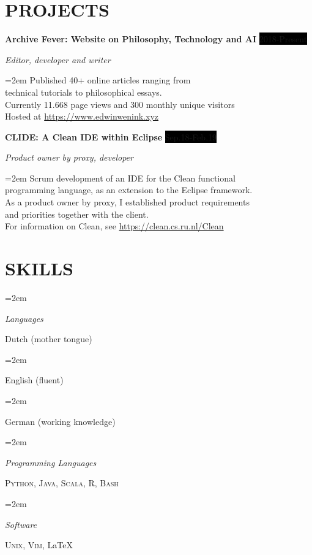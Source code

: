 \documentclass{article}
\newlength{\spacebox}
\newcommand{\sepspace}{\vspace*{1em}}		%
\newcommand{\NewPart}[1]{\section*{\uppercase{#1}}}
\newcommand{\PersonalEntry}[2]{
		\noindent\hangindent=2em\hangafter=0 %
		\parbox{\spacebox}{        %
		\textit{#1}}		       %
		\hspace{1.5em} #2 \par}    %
\newcommand{\SkillsEntry}[2]{      %
		\noindent\hangindent=2em\hangafter=0 %
		\parbox{\spacebox}{        %
		\textit{#1}}			   %
		\hspace{1.5em} #2 \par}    %
\newcommand{\EducationEntry}[4]{
		\noindent \textbf{#1} \hfill      %
		\colorbox{Black}{%
			\parbox{6em}{%
			\hfill\color{White}#2}} \par  %
		\noindent \textit{#3} \par        %
		\noindent\hangindent=2em\hangafter=0 \small #4 %
		\normalsize \par}
\newcommand{\WorkEntry}[4]{				  %
		\noindent \textbf{#1} \hfill      %
		\colorbox{Black}{\color{White}#2} \par  %
		\noindent \textit{#3} \par              %
		\noindent\hangindent=2em\hangafter=0 \small #4 %
		\normalsize \par}
\begin{document}
\NewPart{Projects}{}

\WorkEntry{Archive Fever: Website on Philosophy, Technology and AI}{2018-Present}{Editor, developer and writer}{Published 40+ online articles ranging from\\
	technical tutorials to philosophical essays.\\
	Currently 11.668 page views and 300 monthly unique visitors\\
	Hosted at \url{https://www.edwinwenink.xyz}
}
\sepspace

\WorkEntry{CLIDE: A Clean IDE within Eclipse}{Sep.18-Feb.19}{Product owner by proxy, developer}{Scrum development of an IDE for the Clean functional\\ 
programming language, as an extension to the Eclipse framework.\\
As a product owner by proxy, I established product requirements\\
and priorities together with the client. \\
For information on Clean, see \url{https://clean.cs.ru.nl/Clean}}
\sepspace


\NewPart{Skills}{}

\SkillsEntry{Languages}{Dutch (mother tongue)}
\SkillsEntry{}{English (fluent)}
\SkillsEntry{}{German (working knowledge)}
\sepspace

\SkillsEntry{Programming Languages}{\textsc{Python}, \textsc{Java}, \textsc{Scala}, \textsc{R}, \textsc{Bash}}
\sepspace

\SkillsEntry{Software}{\textsc{Unix}, \textsc{Vim}, \LaTeX}
\sepspace

\end{document}
